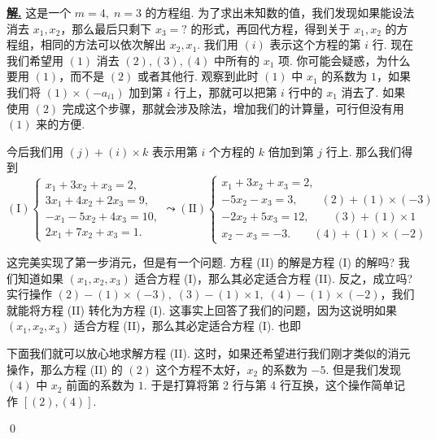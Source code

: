 \documentclass[10pt,openany]{article}
\theoremstyle{thmstyle} %
\theoremstyle{defstyle} %
\theoremstyle{prostyle} %
\newenvironment{solution}{\par\underline{\textbf{解.}} \;\fangsong}{\qed\par}
\begin{document}
\begin{solution}
	这是一个 \( m=4, \; n=3 \) 的方程组. 为了求出未知数的值，我们发现如果能设法消去 \( x_1,x_2 \)，那么最后只剩下 \( x_3=? \) 的形式，再回代方程，得到关于 \( x_1,x_2 \) 的方程组，相同的方法可以依次解出 \( x_2,x_1 \). 我们用 \( (i) \) 表示这个方程的第 \( i \) 行. 现在我们希望用 \( (1) \) 消去 \( (2),(3),(4) \) 中所有的 \( x_1 \) 项. 你可能会疑惑，为什么要用 \( (1) \)，而不是 \( (2) \) 或者其他行. 观察到此时 \( (1) \) 中 \( x_1 \) 的系数为 \( 1 \)，如果我们将 \( (1) \times (-a_{i1}) \) 加到第 \( i \) 行上，那就可以把第 \( i \) 行中的 \( x_1 \) 消去了. 如果使用 \( (2) \) 完成这个步骤，那就会涉及除法，增加我们的计算量，可行但没有用 \( (1) \) 来的方便. 
	
	今后我们用 \( (j)+(i) \times k \) 表示用第 \( i \) 个方程的 \( k \) 倍加到第 \( j \) 行上. 那么我们得到
	\[ (\text{I}) \left\{
	\begin{array}{l}
		x_1 + 3x_2 + x_3 = 2, \\
		3x_1 + 4x_2 + 2x_3 = 9, \\
		-x_1 - 5x_2 + 4x_3 = 10, \\
		2x_1 + 7x_2 + x_3 = 1.
	\end{array}
	\right. \leadsto (\text{II}) \left\{
	\begin{array}{l}
		x_1 + 3x_2 + x_3 = 2, \\
		-5x_2 - x_3 = 3, \qquad (2)+(1) \times (-3) \\
		-2x_2 + 5x_3 = 12, \qquad (3)+(1) \times 1 \\
		x_2 - x_3 = -3.\qquad (4)+(1) \times (-2)
	\end{array}
	\right.\]
	
	这完美实现了第一步消元，但是有一个问题. 方程 (II) 的解是方程 (I) 的解吗? 我们知道如果 \( (x_1,x_2,x_3) \) 适合方程 (I)，那么其必定适合方程 (II). 反之，成立吗? 实行操作 \( (2)-(1) \times (-3), \; (3)-(1) \times 1, \; (4)-(1) \times (-2) \)，我们就能将方程 (II) 转化为方程 (I). 这事实上回答了我们的问题，因为这说明如果 \( (x_1,x_2,x_3) \) 适合方程 (II)，那么其必定适合方程 (I). 也即
	
	\begin{center}
	\end{center}
	
	下面我们就可以放心地求解方程 (II). 这时，如果还希望进行我们刚才类似的消元操作，那么方程 (II) 的 \( (2) \) 这个方程不太好，\( x_2 \) 的系数为 \( -5 \). 但是我们发现 \( (4) \) 中  \( x_2 \) 前面的系数为 \( 1 \). 于是打算将第 2 行与第 4 行互换，这个操作简单记作 \( [(2),(4)] \).
	

\end{solution}
\end{document}
